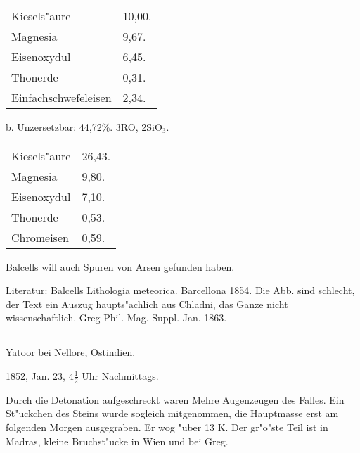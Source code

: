 \documentclass[a4paper, 11pt, oneside]{article}
\begin{document}
\begin{table}[H]
    \centering\swabfamily\Large
    \begin{tabular}{l l}
    \hline
        Kiesels"aure & 10,00. \\
        Magnesia & 9,67. \\
        Eisenoxydul & 6,45. \\
        Thonerde & 0,31. \\
        Einfachschwefeleisen & 2,34. \\
    \end{tabular}
\end{table}

\begin{center}
b. Unzersetzbar: 44,72\%. 3RO, 2SiO$_{3}$.
\end{center}

\begin{table}[H]
    \centering\swabfamily\Large
    \begin{tabular}{l l}
    \hline
        Kiesels"aure & 26,43. \\
        Magnesia & 9,80. \\
        Eisenoxydul & 7,10. \\
        Thonerde & 0,53. \\
        Chromeisen & 0,59. \\
    \end{tabular}
\end{table}

Balcells will auch Spuren von Arsen gefunden haben.

\normalsize
Literatur: Balcells Lithologia meteorica. Barcellona 1854. Die Abb. sind schlecht, der Text ein Auszug haupts"achlich aus Chladni, das Ganze nicht wissenschaftlich. Greg Phil. Mag. Suppl. Jan. 1863.

\subsection{}
\LARGE
\paragraph{}
Yatoor bei Nellore, Ostindien.

1852, Jan. 23, $\mathfrak{4\frac{1}{2}}$ Uhr Nachmittags.

Durch die Detonation aufgeschreckt waren Mehre Augenzeugen des Falles. Ein St"uckchen des Steins wurde sogleich mitgenommen, die Hauptmasse erst am folgenden Morgen ausgegraben. Er wog "uber 13 K. Der gr"o"ste Teil ist in Madras, kleine Bruchst"ucke in Wien und bei Greg.
\end{document}
